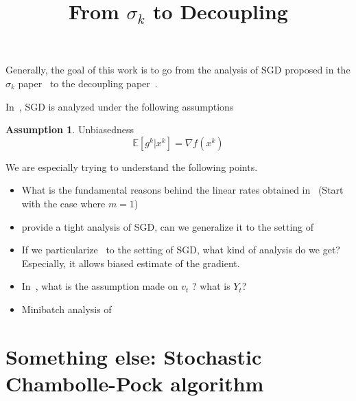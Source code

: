 \documentclass{article}
\title{From $\sigma_k$ to Decoupling}
\newcommand{\bE}{{\mathbb E}}
\theoremstyle{definition}
\newtheorem{assumption}{Assumption}
\begin{document}
\maketitle

\begin{abstract} 

\end{abstract}

Generally, the goal of this work is to go from the analysis of SGD proposed in the $\sigma_k$ paper~\cite{gorbunov2019unified} to the decoupling paper~\cite{mishchenko2019stochastic}.

In~\cite{gorbunov2019unified}, SGD is analyzed under the following assumptions 
\begin{assumption}
Unbiasedness
\begin{equation}
    \bE[g^k|x^k] = \nabla f(x^k)
\end{equation}
\end{assumption}

We are especially trying to understand the following points.
\begin{itemize}
    \item What is the fundamental reasons behind the linear rates obtained in~\cite{mishchenko2019stochastic} (Start with the case where $m=1$)
    \item \cite{gorbunov2019unified} provide a tight analysis of SGD, can we generalize it to the setting of~\cite{mishchenko2019stochastic}
    \item If we particularize~\cite{mishchenko2019stochastic} to the setting of SGD, what kind of analysis do we get? Especially, it allows biased estimate of the gradient.
    \item In~\cite{mishchenko2019stochastic}, what is the assumption made on $v_t$ ? what is $Y_t$?
    \item Minibatch analysis of~\cite{mishchenko2019stochastic} 
\end{itemize}


\section{Something else: Stochastic Chambolle-Pock algorithm}
\end{document}
